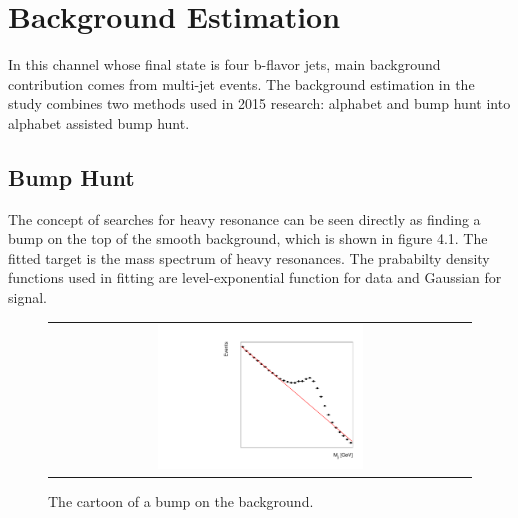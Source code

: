 
\chapter{Background Estimation} \label{chap:4}
In this channel whose final state is four b-flavor jets, main background contribution comes from multi-jet events.
The background estimation in the study combines two methods used in 2015 research: alphabet and bump hunt into alphabet assisted bump hunt\citep{CMS-PAS-B2G-16-008}.
 

\section{Bump Hunt}
The concept of searches for heavy resonance can be seen directly as finding a bump on the top of the smooth background, which is shown in figure 4.1. The fitted target is the mass spectrum of heavy resonances. The prababilty density functions used in fitting are level-exponential function for data and Gaussian for signal.
\begin{figure}[t]
  \centering
  \begin{tabular}{c}
    \includegraphics[width=0.5\textwidth]{Figures/cart.pdf} 
   
  \end{tabular}
  \caption{The cartoon of a bump on the background.}
  \label{fig:hvt_brs}
\end{figure}

